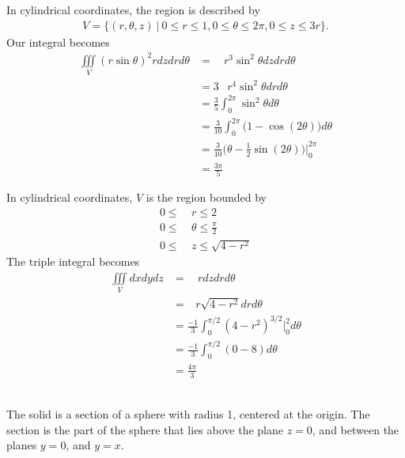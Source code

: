 In cylindrical coordinates, the region is described by 
\begin{align*}
  V = \{(r,\theta,z) \ | \ 0 \le r \le 1, 0 \le \theta \le 2\pi, 0 \le z \le 3r \}.
\end{align*}
Our integral becomes 
\begin{align*}
  \iiint\limits_V (r\sin\theta)^2 rdzdrd\theta 
  &=    \mathop{\int_0^{2\pi} \!\! \int_0^1  \!\! \int_0^{3r}} r^3\sin^2\theta dzdrd\theta  \\
  &=   3 \mathop{\int_0^{2\pi} \!\! \int_0^1} r^4\sin^2\theta drd\theta  \\
  &=   \frac{3}{5} \int_0^{2\pi} \sin^2\theta d\theta  \\
  &=   \frac{3}{10} \int_0^{2\pi} \big(1 - \cos(2\theta)\big) d\theta  \\
  &=   \frac{3}{10} \big(\theta - \frac{1}{2}\sin(2\theta)\big) \Big|_0^{2\pi} \\
  &=   \frac{3\pi}{5}
\end{align*}
\item %
In cylindrical coordinates,  $V$ is the region bounded by
\begin{align*}
  0 \le\ &r \le 2 \\
  0 \le\ &\theta \le \frac{\pi}{2}\\
  0 \le\ &z \le \sqrt{4 - r^2}
\end{align*}
The triple integral becomes
\begin{align*}
  \iiint\limits_V dxdydz
  &=    \mathop{\int_0^{\pi/2} \!\! \int_0^2  \!\! \int_0^{\sqrt{4 - r^2}}} r dzdrd\theta  \\
  &=    \mathop{\int_0^{\pi/2} \!\! \int_0^2 } r\sqrt{4 - r^2}drd\theta  \\
  &=   \frac{-1}{3} \int_0^{\pi/2} (4 - r^2)^{3/2} \Big|_0^2 d\theta  \\
  &=   \frac{-1}{3} \int_0^{\pi/2} (0 - 8) d\theta  \\
  &=   \frac{4\pi}{3}
\end{align*}
\item %
 \\
The solid is a section of a sphere with radius 1, centered at the origin. The section is the part of the sphere that lies above the plane $z=0$, and between the planes $y=0$, and $y=x$. 

